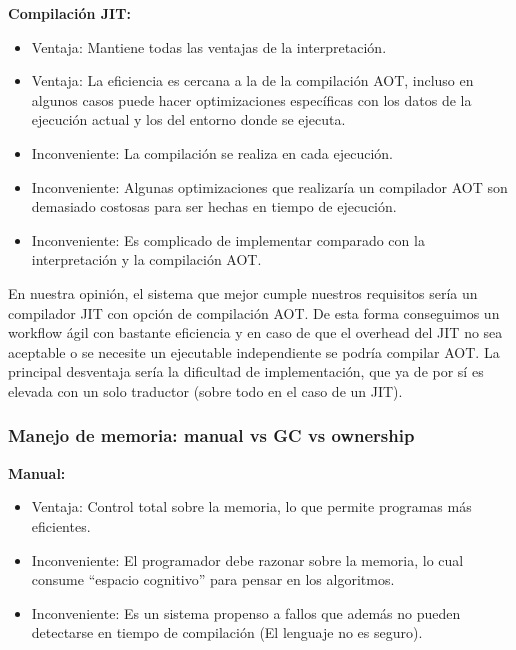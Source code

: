 \textbf{Compilación JIT:}\\

\begin{itemize}
  \item {\color{okgreen} Ventaja}: Mantiene todas las ventajas de la interpretación.\\
  \item {\color{okgreen} Ventaja}: La eficiencia es cercana a la de la compilación AOT, incluso en algunos casos puede hacer optimizaciones específicas con los datos de la ejecución actual y los del entorno donde se ejecuta.\\
  \item {\color{myred} Inconveniente}: La compilación se realiza en cada ejecución.\\
  \item {\color{myred} Inconveniente}: Algunas optimizaciones que realizaría un compilador AOT son demasiado costosas para ser hechas en tiempo de ejecución.\\
  \item {\color{myred} Inconveniente}: Es complicado de implementar comparado con la interpretación y la compilación AOT. 
\end{itemize}

En nuestra opinión, el sistema que mejor cumple nuestros requisitos sería un compilador JIT con opción de compilación AOT. De esta forma conseguimos un workflow ágil con bastante eficiencia y en caso de que el overhead del JIT no sea aceptable o se necesite un ejecutable independiente se podría compilar AOT.
La principal desventaja sería la dificultad de implementación, que ya de por sí es elevada con un solo traductor (sobre todo en el caso de un JIT).


\subsubsection*{Manejo de memoria: manual vs GC vs ownership}

\textbf{Manual:}\\

\begin{itemize}
  \item {\color{okgreen} Ventaja}: Control total sobre la memoria, lo que permite programas más eficientes. \\
  \item {\color{myred} Inconveniente}: El programador debe razonar sobre la memoria, lo cual consume ``espacio cognitivo'' para pensar en los algoritmos.\\
  \item {\color{myred} Inconveniente}: Es un sistema propenso a fallos que además no pueden detectarse en tiempo de compilación (El lenguaje no es seguro).\\
\end{itemize}

